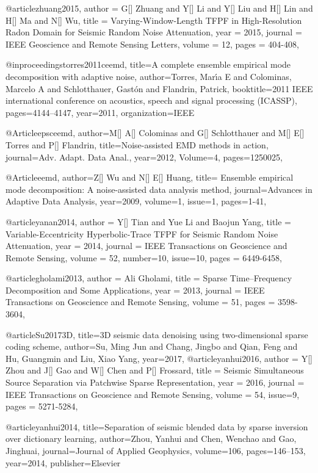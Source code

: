 @article{zhuang2015,
  author =	 {G[] Zhuang and Y[] Li and Y[] Liu and H[] Lin and H[] Ma and N[] Wu},
  title =	 {Varying-Window-Length {TFPF} in High-Resolution Radon Domain for Seismic Random Noise Attenuation},
  year =	 2015,
  journal =	 {IEEE Geoscience and Remote Sensing Letters},
  volume =	 12,
  pages =	 {404-408},
}


@inproceedings{torres2011ceemd,
  title={A complete ensemble empirical mode decomposition with adaptive noise},
  author={Torres, Mar{\'\i}a E and Colominas, Marcelo A and Schlotthauer, Gast{\'o}n and Flandrin, Patrick},
  booktitle={2011 IEEE international conference on acoustics, speech and signal processing (ICASSP)},
  pages={4144--4147},
  year={2011},
  organization={IEEE}
}

@Article{epsceemd,
  author={M[] A[] Colominas and G[] Schlotthauer and M[] E[] Torres and P[] Flandrin},
  title={Noise-assisted {EMD} methods in action},
  journal={Adv. Adapt. Data Anal.},
  year=2012,
  Volume=4,
  pages={1250025},
}

@Article{eemd,
  author={Z[] Wu and N[] E[] Huang},
  title={ Ensemble empirical mode decomposition: A noise-assisted data analysis method},
  journal={Advances in Adaptive Data Analysis},
  year=2009,
  volume=1,
  issue=1,
  pages={1-41},
}

@article{yanan2014,
  author =	 {Y[] Tian and Yue Li and Baojun Yang},
  title =	 {Variable-Eccentricity Hyperbolic-Trace {TFPF} for Seismic Random Noise Attenuation},
  year =	 2014,
  journal =	 {IEEE Transactions on Geoscience and Remote Sensing},
  volume =	 52,
  number=10,
  issue=10,
  pages =	 {6449-6458},
}

@article{gholami2013,
  author =	 {Ali Gholami},
  title =	 {Sparse Time–Frequency Decomposition and Some Applications},
  year =	 2013,
  journal =	 {IEEE Transactions on Geoscience and Remote Sensing},
  volume =	 51,
  pages =	 {3598-3604},
}

@article{Su20173D,
  title={3D seismic data denoising using two-dimensional sparse coding scheme},
  author={Su, Ming Jun and Chang, Jingbo and Qian, Feng and Hu, Guangmin and Liu, Xiao Yang},
  year={2017},
}
@article{yanhui2016,
  author =	 {Y[] Zhou and J[] Gao and W[] Chen and P[] Frossard},
  title =	 {Seismic Simultaneous Source Separation via Patchwise Sparse Representation},
  year =	 2016,
  journal =	 {IEEE Transactions on Geoscience and Remote Sensing},
  volume =	 54,
  issue=9,
  pages =	 {5271-5284},
}

@article{yanhui2014,
  title={Separation of seismic blended data by sparse inversion over dictionary learning},
  author={Zhou, Yanhui and Chen, Wenchao and Gao, Jinghuai},
  journal={Journal of Applied Geophysics},
  volume={106},
  pages={146--153},
  year={2014},
  publisher={Elsevier}
}


